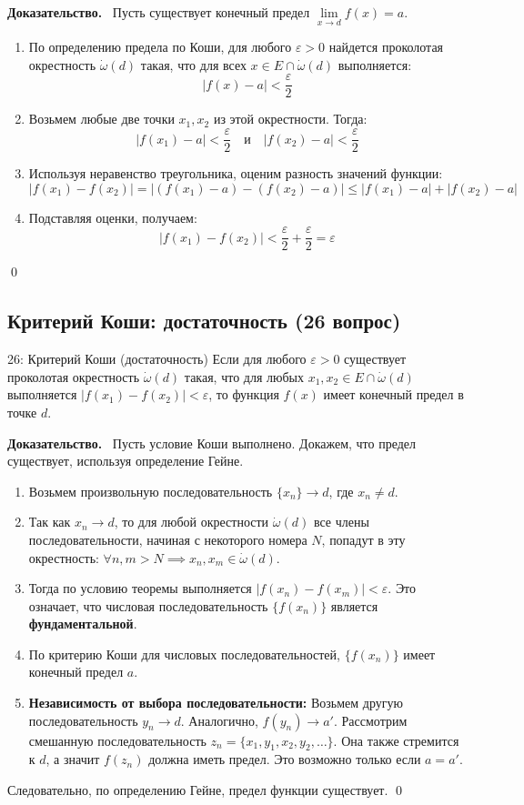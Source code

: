 \documentclass[a4paper,12pt]{article}
\newcommand{\myproof}{\textbf{Доказательство.}\ }
\begin{document}
	\vspace{0.5cm}
	\myproof
	Пусть существует конечный предел $\lim\limits_{x \to d} f(x) = a$.
	\begin{enumerate}
		\item По определению предела по Коши, для любого $\varepsilon > 0$ найдется проколотая окрестность $\dot{\omega}(d)$ такая, что для всех $x \in E \cap \dot{\omega}(d)$ выполняется:
		\[ |f(x) - a| < \frac{\varepsilon}{2} \]
		\item Возьмем любые две точки $x_1, x_2$ из этой окрестности. Тогда:
		\[ |f(x_1) - a| < \frac{\varepsilon}{2} \quad \text{и} \quad |f(x_2) - a| < \frac{\varepsilon}{2} \]
		\item Используя неравенство треугольника, оценим разность значений функции:
		\[ |f(x_1) - f(x_2)| = |(f(x_1) - a) - (f(x_2) - a)| \le |f(x_1) - a| + |f(x_2) - a| \]
		\item Подставляя оценки, получаем:
		\[ |f(x_1) - f(x_2)| < \frac{\varepsilon}{2} + \frac{\varepsilon}{2} = \varepsilon \]
	\end{enumerate} \qed
	
	
	
	\newpage
	\subsection{Критерий Коши: достаточность (26 вопрос)}
	
	\begin{theorembox}{26: Критерий Коши (достаточность)}
		Если для любого $\varepsilon > 0$ существует проколотая окрестность $\dot{\omega}(d)$ такая, что для любых $x_1, x_2 \in E \cap \dot{\omega}(d)$ выполняется $|f(x_1) - f(x_2)| < \varepsilon$, то функция $f(x)$ имеет конечный предел в точке $d$.
	\end{theorembox}
	
	\myproof
	Пусть условие Коши выполнено. Докажем, что предел существует, используя определение Гейне.
	
	\begin{enumerate}
		\item Возьмем произвольную последовательность $\{x_n\} \to d$, где $x_n \neq d$.
		\item Так как $x_n \to d$, то для любой окрестности $\dot{\omega}(d)$ все члены последовательности, начиная с некоторого номера $N$, попадут в эту окрестность: $\forall n, m > N \implies x_n, x_m \in \dot{\omega}(d)$.
		\item Тогда по условию теоремы выполняется $|f(x_n) - f(x_m)| < \varepsilon$. Это означает, что числовая последовательность $\{f(x_n)\}$ является \textbf{фундаментальной}.
		\item По критерию Коши для числовых последовательностей, $\{f(x_n)\}$ имеет конечный предел $a$.
		\item \textbf{Независимость от выбора последовательности:} Возьмем другую последовательность $y_n \to d$. Аналогично, $f(y_n) \to a'$. Рассмотрим смешанную последовательность $z_n = \{x_1, y_1, x_2, y_2, \dots\}$. Она также стремится к $d$, а значит $f(z_n)$ должна иметь предел. Это возможно только если $a = a'$.
	\end{enumerate}
	Следовательно, по определению Гейне, предел функции существует. \qed
	
\end{document}
